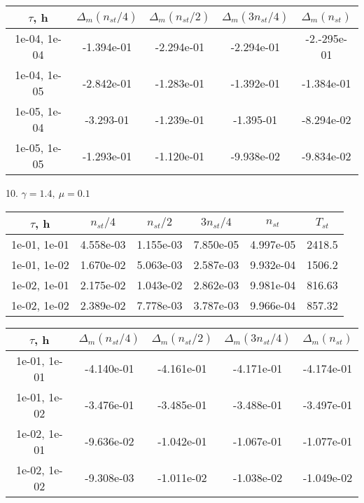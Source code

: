 \begin{center}
	\begin{tabular}{ |c|c|c|c|c| } 
		\hline
		$\tau$, h & $\Delta_m (n_{st}/ 4)$ & $\Delta_m (n_{st}/ 2)$ & $\Delta_m (3n_{st}/ 4)$ & $\Delta_m (n_{st})$ \\ 
		\hline
		1e-04, 1e-04 & -1.394e-01 & -2.294e-01 & -2.294e-01 & -2.-295e-01 \\ 
		\hline
		1e-04, 1e-05 & -2.842e-01 & -1.283e-01 & -1.392e-01 & -1.384e-01 \\ 
		\hline
		1e-05, 1e-04 & -3.293-01 & -1.239e-01 & -1.395-01 & -8.294e-02 \\ 
		\hline
		1e-05, 1e-05 & -1.293e-01 & -1.120e-01 & -9.938e-02 & -9.834e-02 \\ 
		\hline
	\end{tabular}
\end{center}

10. $\gamma = 1.4, \ \mu = 0.1$
\begin{center}
	\begin{tabular}{ |c|c|c|c|c|c| } 
		\hline
		$\tau$, h & $n_{st}/ 4$ & $n_{st}/ 2$ & $3n_{st}/ 4$ & $n_{st}$ & $T_{st}$ \\ 
		\hline
		1e-01, 1e-01 & 4.558e-03 & 1.155e-03 & 7.850e-05 & 4.997e-05 & 2418.5\\ 
		\hline
		1e-01, 1e-02 & 1.670e-02 & 5.063e-03 & 2.587e-03 & 9.932e-04 & 1506.2\\ 
		\hline
		1e-02, 1e-01 & 2.175e-02 & 1.043e-02 & 2.862e-03 & 9.981e-04 & 816.63\\ 
		\hline
		1e-02, 1e-02 & 2.389e-02 & 7.778e-03 & 3.787e-03 & 9.966e-04 & 857.32\\ 
		\hline
	\end{tabular}
\end{center}

\begin{center}
	\begin{tabular}{ |c|c|c|c|c| } 
		\hline
		$\tau$, h & $\Delta_m (n_{st}/ 4)$ & $\Delta_m (n_{st}/ 2)$ & $\Delta_m (3n_{st}/ 4)$ & $\Delta_m (n_{st})$ \\ 
		\hline
		1e-01, 1e-01 & -4.140e-01 & -4.161e-01 & -4.171e-01 & -4.174e-01 \\ 
		\hline
		1e-01, 1e-02 & -3.476e-01 & -3.485e-01 & -3.488e-01 & -3.497e-01 \\ 
		\hline
		1e-02, 1e-01 & -9.636e-02 & -1.042e-01 & -1.067e-01 & -1.077e-01 \\ 
		\hline
		1e-02, 1e-02 & -9.308e-03 & -1.011e-02 & -1.038e-02 & -1.049e-02 \\ 
		\hline
	\end{tabular}
\end{center}

